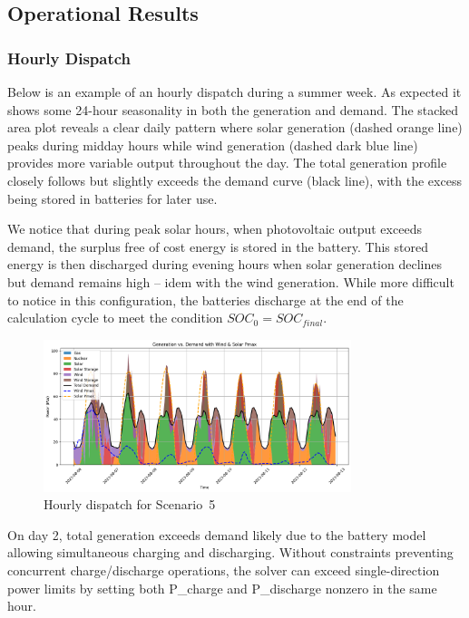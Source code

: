 \subsection{Operational Results}
\label{sec:operational_results}

\subsubsection{Hourly Dispatch}
Below is an example of an hourly dispatch during a summer week. As expected it shows some 24-hour seasonality in 
both the generation and demand. The stacked area plot reveals a clear daily pattern where solar generation (dashed 
orange line) peaks during midday hours while wind generation (dashed dark blue line) provides more variable output 
throughout the day. The total generation profile closely follows but slightly exceeds the demand curve (black line), 
with the excess being stored in batteries for later use.

We notice that during peak solar hours, when photovoltaic output exceeds demand, the surplus free of cost energy is 
stored in the battery. This stored energy is then discharged during evening hours when solar generation declines but 
demand remains high -- idem with the wind generation. While more difficult to notice in this configuration, the 
batteries discharge at the end of the calculation cycle to meet the condition $SOC_{0} = SOC_{final}$.

\begin{figure}[h]
    \centering
    \includegraphics[width=0.8\textwidth]{images/gen_vs_demand-summer.png}
    \caption{Hourly dispatch for Scenario~5}
    \label{fig:scenario_5_dispatch}
\end{figure}

On day 2, total generation exceeds demand likely due to the battery model allowing simultaneous charging and discharging. 
Without constraints preventing concurrent charge/discharge operations, the solver can exceed single-direction power 
limits by setting both P\_charge and P\_discharge nonzero in the same hour.

